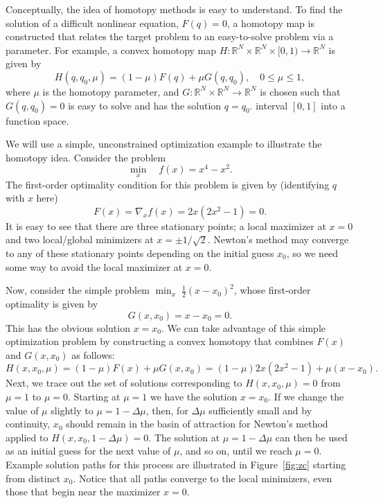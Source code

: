 Conceptually, the idea of homotopy methods is easy to understand. To find the
solution of a difficult nonlinear equation, $F(q)=0$, a homotopy map is
constructed that relates the target problem to an easy-to-solve problem via a
parameter.  For example, a convex homotopy map $H : \mathbb{R}^N \times
\mathbb{R}^{N} \times [0,1) \rightarrow \mathbb{R}^N$ is given by
\begin{equation}\label{eq:homotopy}
H(q, q_0, \mu) = (1-\mu) F(q) + \mu G(q,q_0),\quad 0 \leq \mu \leq 1,
\end{equation}
where $\mu$ is the homotopy parameter, and $G : \mathbb{R}^N\times\mathbb{R}^{N}
\rightarrow \mathbb{R}^N$ is chosen such that $G(q,q_0)=0$ is easy to solve and
has the solution $q=q_0$.  %
interval $[0,1]$ into a function space.

We will use a simple, unconstrained optimization example to illustrate the
homotopy idea. Consider the problem
\begin{equation*}
\min_x  \quad  f(x) = x^4 - x^2.
\end{equation*}
The first-order optimality condition for this problem is given by (identifying
$q$ with $x$ here)
\begin{equation*}
F(x) = \nabla_x f(x) = 2x(2x^2 - 1) = 0.
\end{equation*}
It is easy to see that there are three stationary points; a local maximizer at
$x=0$ and two local/global minimizers at $x=\pm 1/\sqrt{2}$.  Newton's method
may converge to any of these stationary points depending on the initial guess
$x_0$, so we need some way to avoid the local maximizer at $x=0$.

Now, consider the simple problem $\min_x \; \frac{1}{2}(x - x_0)^2$, whose
first-order optimality is given by
\begin{equation*}
G(x,x_0) = x - x_0 = 0.
\end{equation*}
This has the obvious solution $x=x_0$.  We can take advantage of this simple
optimization problem by constructing a convex homotopy that combines $F(x)$ and
$G(x,x_0)$ as follows:
\begin{equation*}
  H(x, x_0, \mu) = (1-\mu) F(x) + \mu G(x, x_0) = (1 - \mu) 2x(2x^2 -1) + \mu (x
  - x_0).
\end{equation*}
Next, we trace out the set of solutions corresponding to $H(x,x_0,\mu)=0$ from
$\mu=1$ to $\mu=0$.  Starting at $\mu=1$ we have the solution $x=x_0$.  If we
change the value of $\mu$ slightly to $\mu = 1 - \Delta \mu$, then, for $\Delta
\mu$ sufficiently small and by continuity, $x_0$ should remain in the basin of
attraction for Newton's method applied to $H(x, x_0, 1-\Delta \mu)=0$.  The
solution at $\mu= 1 - \Delta \mu$ can then be used as an initial guess for the
next value of $\mu$, and so on, until we reach $\mu = 0$.  Example solution
paths for this process are illustrated in Figure~\ref{fig:zc} starting from
distinct $x_0$.  Notice that all paths converge to the local minimizers, even
those that begin near the maximizer $x=0$.

